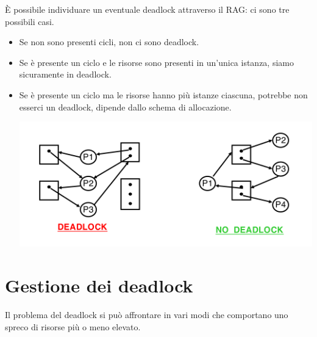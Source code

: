 \documentclass[a4paper,12pt, twoside]{report}
\begin{document}
\newpage
\`E possibile individuare un eventuale deadlock attraverso il RAG: ci sono tre possibili casi.
\begin{itemize} 
\item Se non sono presenti cicli, non ci sono deadlock.
\item Se \`e presente un ciclo e le risorse sono presenti in un'unica istanza, siamo sicuramente in deadlock.
\begin{center}
\end{center}
\item Se \`e presente un ciclo ma le risorse hanno pi\`u istanze ciascuna, potrebbe non esserci un deadlock, dipende dallo
schema di allocazione.
\begin{center}
\includegraphics[scale=0.3]{ciclograf}
\end{center}
\end{itemize}

\section{Gestione dei deadlock}
Il problema del deadlock si pu\`o affrontare in vari modi che comportano uno spreco di risorse pi\`u o meno elevato. 
\end{document}
